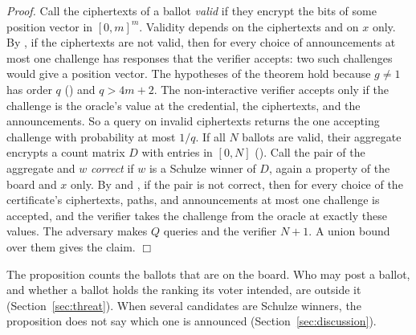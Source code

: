 \emph{Proof.} Call the ciphertexts of a ballot \emph{valid} if they
encrypt the bits of some position vector in $[0,m]^m$. Validity depends
on the ciphertexts and on $x$ only. By , if the
ciphertexts are not valid, then for every choice of announcements at
most one challenge has responses that the verifier accepts: two such
challenges would give a position vector. The hypotheses of the theorem
hold because $g \ne 1$ has order $q$ () and $q >
4m + 2$. The non-interactive verifier accepts only if the challenge is
the oracle's value at the credential, the ciphertexts, and the
announcements. So a query on invalid ciphertexts returns the one
accepting challenge with probability at most $1/q$. If all $N$ ballots
are valid, their aggregate encrypts a count matrix $D$ with entries in
$[0, N]$ (). Call the pair of the aggregate and $w$
\emph{correct} if $w$ is a Schulze winner of $D$, again a property of
the board and $x$ only. By  and
, if the pair is not correct, then for every choice of
the certificate's ciphertexts, paths, and announcements at most one
challenge is accepted, and the verifier takes the challenge from the
oracle at exactly these values. The adversary makes $Q$ queries and the
verifier $N + 1$. A union bound over them gives the claim. \hfill$\Box$

The proposition counts the ballots that are on the board. Who may post a
ballot, and whether a ballot holds the ranking its voter intended, are
outside it (Section~\ref{sec:threat}). When several candidates are
Schulze winners, the proposition does not say which one is announced
(Section~\ref{sec:discussion}).

